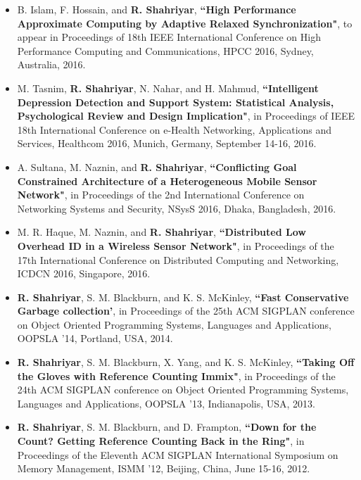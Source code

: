 \documentclass[letterpaper,11pt]{article}
\begin{document}
\begin{itemize}

\item B. Islam, F. Hossain, and {\bf R. Shahriyar}, {\color{black} \bf
    ``High Performance Approximate Computing by Adaptive Relaxed Synchronization"}, to appear in Proceedings of 18th IEEE International Conference on High Performance Computing and Communications, HPCC 2016, Sydney, Australia, 2016.
        
\item M. Tasnim, {\bf R. Shahriyar}, N. Nahar, and H. Mahmud,  {\color{black} \bf
    ``Intelligent Depression Detection and Support System: Statistical Analysis, Psychological Review and Design Implication"}, in Proceedings of IEEE 18th International Conference on e-Health Networking, Applications and Services, Healthcom 2016, Munich, Germany, September 14-16, 2016.     

\item A. Sultana, M. Naznin, and {\bf R. Shahriyar}, {\color{black} \bf
    ``Conflicting Goal Constrained Architecture of a Heterogeneous Mobile Sensor Network"}, in Proceedings of the 2nd International Conference on Networking Systems and Security, NSysS 2016, Dhaka, Bangladesh, 2016.

\item M. R. Haque, M. Naznin, and {\bf R. Shahriyar}, {\color{black} \bf
    ``Distributed Low Overhead ID in a Wireless Sensor Network"}, in Proceedings of the 17th International Conference on Distributed Computing and Networking, ICDCN 2016, Singapore, 2016.

\item {\bf R. Shahriyar}, S. M. Blackburn, and K. S. McKinley,  {\color{black} \bf
    ``Fast Conservative Garbage collection'}, in Proceedings of the 25th ACM SIGPLAN conference on Object Oriented Programming Systems, Languages and Applications, OOPSLA '14, Portland, USA, 2014.

\item {\bf R. Shahriyar}, S. M. Blackburn, X. Yang, and K. S. McKinley, {\color{black} \bf
    ``Taking Off the Gloves with Reference Counting Immix"},  in Proceedings of the 24th ACM SIGPLAN conference on Object Oriented Programming Systems, Languages and Applications, OOPSLA '13, Indianapolis, USA, 2013.

\item {\bf R. Shahriyar}, S. M. Blackburn, and D. Frampton,  {\color{black} \bf
    ``Down for the Count? Getting Reference Counting Back in the Ring"}, in Proceedings of the Eleventh ACM SIGPLAN International Symposium on Memory Management, ISMM '12, Beijing, China, June 15-16, 2012.


\end{itemize}
\end{document}
